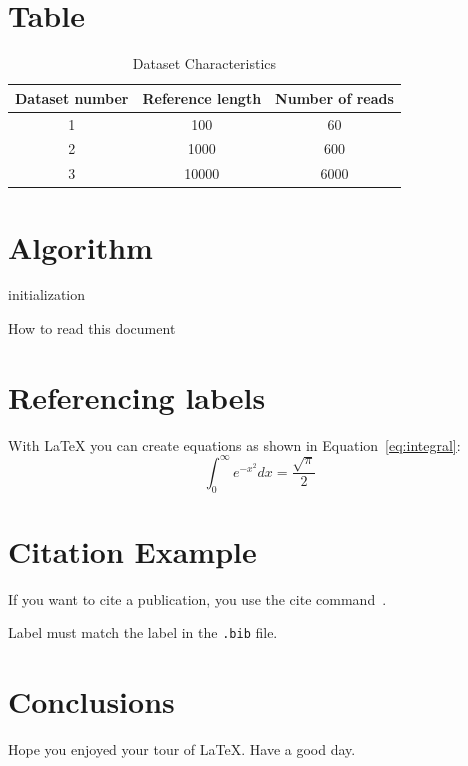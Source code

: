 \documentclass{article}
\begin{document}
\section{Table}

\begin{table}[h]
\begin{center}
\caption{Dataset Characteristics}
\begin{tabular}{|c|c|c|}
\hline
Dataset number & Reference length & Number of reads \\ \hline
1 & 100   & 60   \\ \hline
2 & 1000  & 600  \\ \hline
3 & 10000 & 6000 \\ \hline
\end{tabular}
\label{table:datasets}
\end{center}
\end{table}

\section{Algorithm}

\begin{algorithm}[H]
 \SetAlgoLined
 initialization\;
\caption{How to read this document}
\end{algorithm}

\section{Referencing labels}

With LaTeX you can create equations as shown in Equation~\ref{eq:integral}:
%
\begin{equation}
\int_0^\infty e^{-x^2} dx=\frac{\sqrt{\pi}}{2}
\label{eq:integral}
\end{equation}

\section{Citation Example}

If you want to cite a publication, you use the cite
command~\cite{CME211:2013:FinalProjectPart1}.

Label must match the label in the \texttt{.bib} file.

\section{Conclusions}

Hope you enjoyed your tour of \LaTeX. Have a good day.


\end{document}
